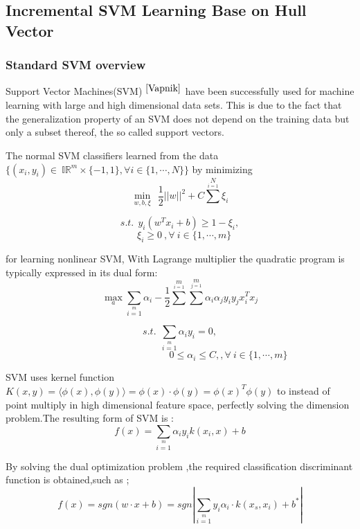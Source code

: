 \documentclass[a4paper]{article}
\begin{document}
    \subsection{Incremental SVM Learning Base on Hull Vector}
    \subsubsection{Standard SVM overview}
Support Vector Machines(SVM) $^{\cite{Vapnik}}$ have been successfully used for machine learning with large and high dimensional data sets. This is due to the fact that the generalization property of an SVM does not depend on the training data but only a subset thereof, the so called support vectors.

The normal SVM classifiers learned from the data $\{ (x_i,y_i)\in\ \mathbb{IR}^m \times \{ -1, 1 \} ,\forall i \in \{ 1,\cdots,N \} \}$ by minimizing
\begin{equation}
\min \limits_{w,b,\xi} \ \ \frac{1}{2}||w||^2+C\sum^{N} \limits_{i=1}\xi_i \tag{1}
\end{equation}


$$
s.t. \ \ y_i(w^T x_i + b)\geq 1-\xi_i,
$$
$$
\ \ \ \ \xi_i \geq  0 \ ,\forall \ i \in \{1,\cdots,m\}
$$

for learning nonlinear SVM, With Lagrange multiplier the quadratic program is typically expressed in its dual form:
\begin{equation}
\max_a  \sum_{i=1}\limits^{m} \alpha_i - \frac{1}{2} \sum \limits^{m} \limits_{i=1} \sum \limits^{m} \limits_{j=1} \alpha_i \alpha_j y_i y_j x_i^T x_j \tag{2}
\end{equation}

$$
s.t. \ \ \sum \limits_{i=1} \limits^{m} \alpha_i y_i = 0 ,
$$
$$
     \qquad \qquad \qquad \qquad \qquad 0\leq \alpha_i \leq C, ,\forall \ i \in \{1,\cdots,m\}
$$

SVM uses kernel function  $K(x,y)= \langle\phi(x) , \phi(y)\rangle =\phi(x) \cdot \phi(y) = \phi(x)^T  \phi(y)$  to instead of point multiply in high dimensional feature space, perfectly solving the dimension problem.The resulting form of SVM is :
\begin{equation}
f(x) = \sum \limits_{i=1} \limits^{m} \alpha_i y_i k(x_i,x) + b \tag{3}
\end{equation}

By solving the dual optimization problem ,the required classification discriminant function is obtained,such as ;
\begin{equation}
f(x) = sgn( w \cdot x + b ) = sgn \left|\sum \limits_{i=1} \limits^{m} y_i \alpha_i \cdot k(x_s,x_i)+b^*  \right|   \tag{4}
\end{equation}
\end{document}
